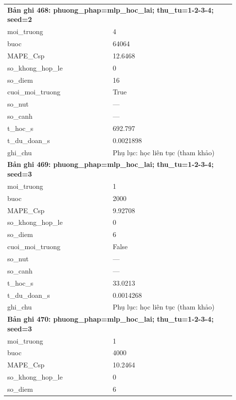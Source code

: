 \begin{longtable}{p{0.43\linewidth}p{0.50\linewidth}}
\midrule
\multicolumn{2}{p{0.95\linewidth}}{\textbf{Bản ghi 468: phuong\_phap=mlp\_hoc\_lai; thu\_tu=1-2-3-4; seed=2}} \\
moi\_\allowbreak truong & 4 \\
buoc & 64064 \\
MAPE\_\allowbreak Csp & 12.6468 \\
so\_\allowbreak khong\_\allowbreak hop\_\allowbreak le & 0 \\
so\_\allowbreak diem & 16 \\
cuoi\_\allowbreak moi\_\allowbreak truong & True \\
so\_\allowbreak nut & — \\
so\_\allowbreak canh & — \\
t\_\allowbreak hoc\_\allowbreak s & 692.797 \\
t\_\allowbreak du\_\allowbreak doan\_\allowbreak s & 0.0021898 \\
ghi\_\allowbreak chu & Phụ lục: học liên tục (tham khảo) \\
\midrule
\multicolumn{2}{p{0.95\linewidth}}{\textbf{Bản ghi 469: phuong\_phap=mlp\_hoc\_lai; thu\_tu=1-2-3-4; seed=3}} \\
moi\_\allowbreak truong & 1 \\
buoc & 2000 \\
MAPE\_\allowbreak Csp & 9.92708 \\
so\_\allowbreak khong\_\allowbreak hop\_\allowbreak le & 0 \\
so\_\allowbreak diem & 6 \\
cuoi\_\allowbreak moi\_\allowbreak truong & False \\
so\_\allowbreak nut & — \\
so\_\allowbreak canh & — \\
t\_\allowbreak hoc\_\allowbreak s & 33.0213 \\
t\_\allowbreak du\_\allowbreak doan\_\allowbreak s & 0.0014268 \\
ghi\_\allowbreak chu & Phụ lục: học liên tục (tham khảo) \\
\midrule
\multicolumn{2}{p{0.95\linewidth}}{\textbf{Bản ghi 470: phuong\_phap=mlp\_hoc\_lai; thu\_tu=1-2-3-4; seed=3}} \\
moi\_\allowbreak truong & 1 \\
buoc & 4000 \\
MAPE\_\allowbreak Csp & 10.2464 \\
so\_\allowbreak khong\_\allowbreak hop\_\allowbreak le & 0 \\
so\_\allowbreak diem & 6 \\

\end{longtable}
